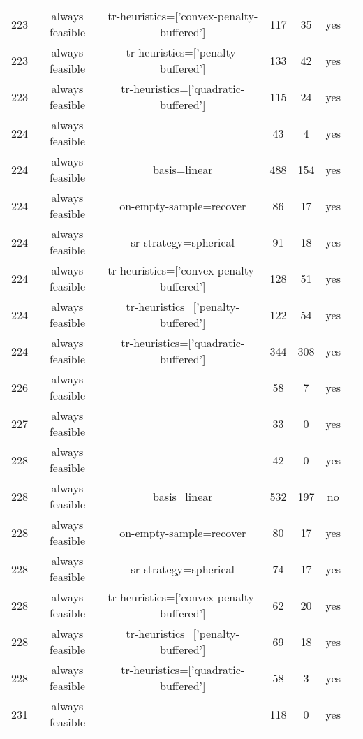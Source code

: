 \begin{footnotesize}
\begin{center}
\begin{longtable}{ccccccc}
223 & always feasible & tr-heuristics=['convex-penalty-buffered'] &    117 &     35 &     yes\\
223 & always feasible &        tr-heuristics=['penalty-buffered'] &    133 &     42 &     yes\\
223 & always feasible &      tr-heuristics=['quadratic-buffered'] &    115 &     24 &     yes\\
224 & always feasible &                                           &     43 &      4 &     yes\\
224 & always feasible &                              basis=linear &    488 &    154 &     yes\\
224 & always feasible &                   on-empty-sample=recover &     86 &     17 &     yes\\
224 & always feasible &                     sr-strategy=spherical &     91 &     18 &     yes\\
224 & always feasible & tr-heuristics=['convex-penalty-buffered'] &    128 &     51 &     yes\\
224 & always feasible &        tr-heuristics=['penalty-buffered'] &    122 &     54 &     yes\\
224 & always feasible &      tr-heuristics=['quadratic-buffered'] &    344 &    308 &     yes\\
226 & always feasible &                                           &     58 &      7 &     yes\\
227 & always feasible &                                           &     33 &      0 &     yes\\
228 & always feasible &                                           &     42 &      0 &     yes\\
228 & always feasible &                              basis=linear &    532 &    197 &      no\\
228 & always feasible &                   on-empty-sample=recover &     80 &     17 &     yes\\
228 & always feasible &                     sr-strategy=spherical &     74 &     17 &     yes\\
228 & always feasible & tr-heuristics=['convex-penalty-buffered'] &     62 &     20 &     yes\\
228 & always feasible &        tr-heuristics=['penalty-buffered'] &     69 &     18 &     yes\\
228 & always feasible &      tr-heuristics=['quadratic-buffered'] &     58 &      3 &     yes\\
231 & always feasible &                                           &    118 &      0 &     yes\\

\end{longtable}
\end{center}
\end{footnotesize}
